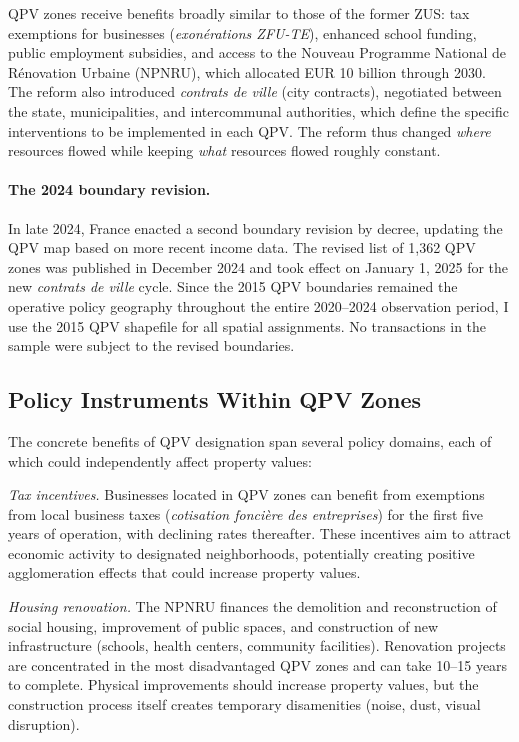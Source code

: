 \documentclass[12pt]{article}
\begin{document}
QPV zones receive benefits broadly similar to those of the former ZUS: tax exemptions for businesses (\textit{exon\'{e}rations ZFU-TE}), enhanced school funding, public employment subsidies, and access to the Nouveau Programme National de R\'{e}novation Urbaine (NPNRU), which allocated EUR 10 billion through 2030. The reform also introduced \textit{contrats de ville} (city contracts), negotiated between the state, municipalities, and intercommunal authorities, which define the specific interventions to be implemented in each QPV. The reform thus changed \textit{where} resources flowed while keeping \textit{what} resources flowed roughly constant.

\paragraph{The 2024 boundary revision.} In late 2024, France enacted a second boundary revision by decree, updating the QPV map based on more recent income data. The revised list of 1,362 QPV zones was published in December 2024 and took effect on January 1, 2025 for the new \textit{contrats de ville} cycle. Since the 2015 QPV boundaries remained the operative policy geography throughout the entire 2020--2024 observation period, I use the 2015 QPV shapefile for all spatial assignments. No transactions in the sample were subject to the revised boundaries.

\subsection{Policy Instruments Within QPV Zones}

The concrete benefits of QPV designation span several policy domains, each of which could independently affect property values:

\textit{Tax incentives.} Businesses located in QPV zones can benefit from exemptions from local business taxes (\textit{cotisation fonci\`{e}re des entreprises}) for the first five years of operation, with declining rates thereafter. These incentives aim to attract economic activity to designated neighborhoods, potentially creating positive agglomeration effects that could increase property values.

\textit{Housing renovation.} The NPNRU finances the demolition and reconstruction of social housing, improvement of public spaces, and construction of new infrastructure (schools, health centers, community facilities). Renovation projects are concentrated in the most disadvantaged QPV zones and can take 10--15 years to complete. Physical improvements should increase property values, but the construction process itself creates temporary disamenities (noise, dust, visual disruption).
\end{document}
